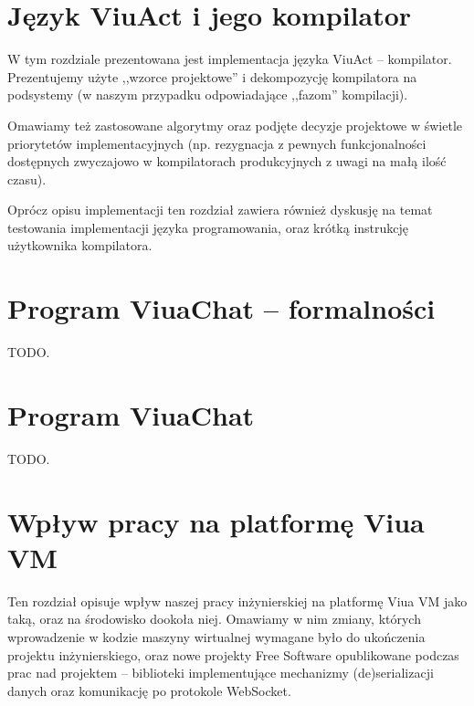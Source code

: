\documentclass[11pt,oneside,a4paper,titlepage,onecolumn]{book}
\begin{document}
\section{Język ViuAct i jego kompilator}

W tym rozdziale prezentowana jest implementacja języka ViuAct -- kompilator. Prezentujemy użyte ,,wzorce
projektowe'' i dekompozycję kompilatora na podsystemy (w naszym przypadku odpowiadające ,,fazom'' kompilacji).

Omawiamy też zastosowane algorytmy oraz podjęte decyzje projektowe w świetle priorytetów implementacyjnych
(np. rezygnacja z pewnych funkcjonalności dostępnych zwyczajowo w kompilatorach produkcyjnych z uwagi na małą 
ilość czasu).

Oprócz opisu implementacji ten rozdział zawiera również dyskusję na temat testowania implementacji języka
programowania, oraz krótką instrukcję użytkownika kompilatora.


\section{Program ViuaChat -- formalności}

TODO.

\section{Program ViuaChat}

TODO.


\section{Wpływ pracy na platformę Viua VM}

Ten rozdział opisuje wpływ naszej pracy inżynierskiej na platformę Viua VM jako taką, oraz na środowisko
dookoła niej. Omawiamy w nim zmiany, których wprowadzenie w kodzie maszyny wirtualnej wymagane było do
ukończenia projektu inżynierskiego, oraz nowe projekty Free Software opublikowane podczas prac nad projektem
-- biblioteki implementujące mechanizmy (de)serializacji danych oraz komunikację po protokole WebSocket.
\end{document}
